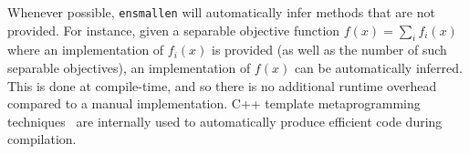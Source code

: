 \documentclass[twoside,11pt]{article}
\begin{document}
Whenever possible, {\tt ensmallen} will automatically infer methods that are
not provided.  For instance, given a separable objective function $f(x) = \sum_i
f_i(x)$ where an implementation of $f_i(x)$ is provided (as well as the number
of such separable objectives), an implementation of $f(x)$ can be automatically
inferred.  This is done at compile-time, and so there is no additional runtime
overhead compared to a manual implementation.  C++ template metaprogramming
techniques~\citep{alexandrescu2001modern,Abrahams_2004} are
internally used to automatically produce efficient code during compilation.



% 
% 
% 
% 
% 
\end{document}
